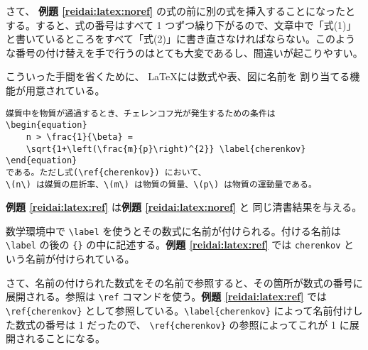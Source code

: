 さて、 \textbf{例題 \ref{reidai:latex:noref}} の式の前に別の式を挿入することになったとする。すると、式の番号はすべて 1 つずつ繰り下がるので、文章中で「式(1)」と書いているところをすべて「式(2)」に書き直さなければならない。このような番号の付け替えを手で行うのはとても大変であるし、間違いが起こりやすい。

こういった手間を省くために、 \LaTeX には数式や表、図に名前を
割り当てる機能が用意されている。
\begin{reidai}
    \label{reidai:latex:ref}
    \begin{verbatim}
媒質中を物質が通過するとき、チェレンコフ光が発生するための条件は
\begin{equation}
    n > \frac{1}{\beta} =
    \sqrt{1+\left(\frac{m}{p}\right)^{2}} \label{cherenkov}
\end{equation}
である。ただし式(\ref{cherenkov}) において、
\(n\) は媒質の屈折率、\(m\) は物質の質量、\(p\) は物質の運動量である。
\end{verbatim}
\end{reidai} \noindent
\textbf{例題 \ref{reidai:latex:ref}} は\textbf{例題 \ref{reidai:latex:noref}} と
同じ清書結果を与える。

数学環境中で \verb|\label| を使うとその数式に名前が付けられる。付ける名前は \verb|\label| の後の \verb|{}| の中に記述する。\textbf{例題 \ref{reidai:latex:ref}} では \texttt{cherenkov} という名前が付けられている。

さて、名前の付けられた数式をその名前で参照すると、その箇所が数式の番号に展開される。参照は \verb|\ref| コマンドを使う。\textbf{例題 \ref{reidai:latex:ref}} では \verb|\ref{cherenkov}| として参照している。\verb|\label{cherenkov}| によって名前付けした数式の番号は 1 だったので、 \verb|\ref{cherenkov}| の参照によってこれが 1 に展開されることになる。

